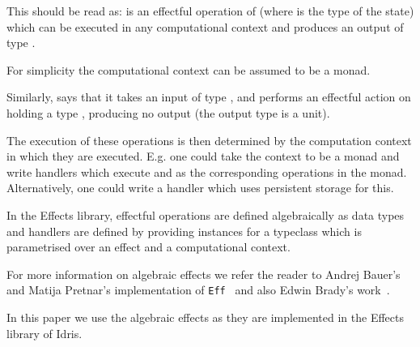 This should be read as:  is an effectful operation of 
(where  is the type of the state) which can be executed in any
computational context  and produces an output of type .

For simplicity the computational context can be assumed to be a monad.

Similarly,  says that it takes an input of type , and
performs an effectful action on  holding a type , producing
no output (the output type is a unit).

The execution of these operations is then determined by the computation context
in which they are executed. E.g. one could take the context to be a
 monad and write handlers which execute  and 
as the corresponding operations in the  monad. Alternatively, one
could write a handler which uses persistent storage for this.

In the Effects library, effectful operations are defined algebraically as data
types and handlers are defined by providing instances for a 
typeclass which is parametrised over an effect and a computational context.

For more information on algebraic effects we refer the reader to Andrej Bauer's
and Matija Pretnar's implementation of \texttt{Eff}~\cite{eff} and also Edwin
Brady's work~\cite{effects-idr}.

In this paper we use the algebraic effects as they are implemented in the
Effects library of Idris.
